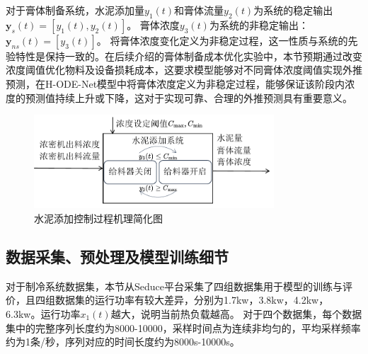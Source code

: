 对于膏体制备系统，水泥添加量$y_1(t)$和膏体流量$y_2(t)$为系统的稳定输出$\boldsymbol y_s(t)=[y_1(t), y_2(t)]$。
膏体浓度$y_3(t)$为系统的非稳定输出：$\boldsymbol y_{ns}(t)=[y_3(t)]$。
将膏体浓度变化定义为非稳定过程，这一性质与系统的先验特性是保持一致的。在后续介绍的膏体制备成本优化实验中，本节预期通过改变浓度阈值优化物料及设备损耗成本，这要求模型能够对不同膏体浓度阈值实现外推预测，在H-ODE-Net模型中将膏体浓度定义为非稳定过程，能够保证该阶段内浓度的预测值持续上升或下降，这对于实现可靠、合理的外推预测具有重要意义。
\begin{figure}[h]
    \centering
    \includegraphics[width=0.8\textwidth]{figures/chapter4/add_cement_workloop.pdf}
  \caption{水泥添加控制过程机理简化图}
  \label{fig:add_cement_workloop} 
\end{figure}


\subsection{数据采集、预处理及模型训练细节}

对于制冷系统数据集，本节从Seduce平台采集了四组数据集用于模型的训练与评价，且四组数据集的运行功率有较大差异，分别为1.7kw，3.8kw，4.2kw，6.3kw。运行功率$x_1(t)$越大，说明当前热负载越高。
对于四个数据集，每个数据集中的完整序列长度约为8000-10000，采样时间点为连续非均匀的，平均采样频率约为1条/秒，序列对应的时间长度约为8000s-10000s。


